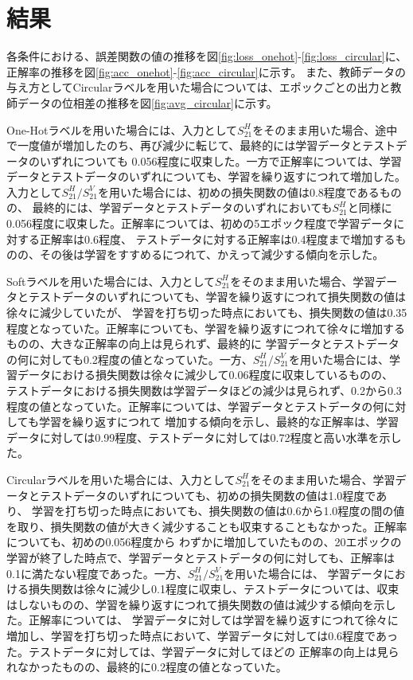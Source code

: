 \documentclass[11pt,a4paper,uplatex]{ujarticle}
\begin{document}
\section{結果}

  各条件における、誤差関数の値の推移を図\ref{fig:loss_onehot}-\ref{fig:loss_circular}に、正解率の推移を図\ref{fig:acc_onehot}-\ref{fig:acc_circular}に示す。
  また、教師データの与え方としてCircularラベルを用いた場合については、エポックごとの出力と教師データの位相差の推移を図\ref{fig:avg_circular}に示す。

  One-Hotラベルを用いた場合には、入力として$S_{21}^H$をそのまま用いた場合、途中で一度値が増加したのち、再び減少に転じて、最終的には学習データとテストデータのいずれについても
  0.056程度に収束した。一方で正解率については、学習データとテストデータのいずれについても、学習を繰り返すにつれて増加した。
  入力として$S_{21}^H/S_{21}^V$を用いた場合には、初めの損失関数の値は0.8程度であるものの、
  最終的には、学習データとテストデータのいずれにおいても$S_{21}^H$と同様に0.056程度に収束した。正解率については、初めの5エポック程度で学習データに対する正解率は0.6程度、
  テストデータに対する正解率は0.4程度まで増加するものの、その後は学習をすすめるにつれて、かえって減少する傾向を示した。

  Softラベルを用いた場合には、入力として$S_{21}^H$をそのまま用いた場合、学習データとテストデータのいずれについても、学習を繰り返すにつれて損失関数の値は徐々に減少していたが、
  学習を打ち切った時点においても、損失関数の値は0.35程度となっていた。正解率についても、学習を繰り返すにつれて徐々に増加するものの、大きな正解率の向上は見られず、最終的に
  学習データとテストデータの何に対しても0.2程度の値となっていた。一方、$S_{21}^H/S_{21}^V$を用いた場合には、学習データにおける損失関数は徐々に減少して0.06程度に収束しているものの、
  テストデータにおける損失関数は学習データほどの減少は見られず、0.2から0.3程度の値となっていた。正解率については、学習データとテストデータの何に対しても学習を繰り返すにつれて
  増加する傾向を示し、最終的な正解率は、学習データに対しては0.99程度、テストデータに対しては0.72程度と高い水準を示した。

  Circularラベルを用いた場合には、入力として$S_{21}^H$をそのまま用いた場合、学習データとテストデータのいずれについても、初めの損失関数の値は1.0程度であり、
  学習を打ち切った時点においても、損失関数の値は0.6から1.0程度の間の値を取り、損失関数の値が大きく減少することも収束することもなかった。正解率についても、初めの0.056程度から
  わずかに増加していたものの、20エポックの学習が終了した時点で、学習データとテストデータの何に対しても、正解率は0.1に満たない程度であった。一方、$S_{21}^H/S_{21}^V$を用いた場合には、
  学習データにおける損失関数は徐々に減少し0.1程度に収束し、テストデータについては、収束はしないものの、学習を繰り返すにつれて損失関数の値は減少する傾向を示した。正解率については、
  学習データに対しては学習を繰り返すにつれて徐々に増加し、学習を打ち切った時点において、学習データに対しては0.6程度であった。テストデータに対しては、学習データに対してほどの
  正解率の向上は見られなかったものの、最終的に0.2程度の値となっていた。
\end{document}
